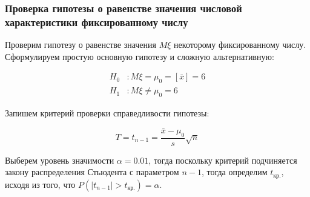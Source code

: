 \documentclass{report}
\begin{document}
\newpage

\subsubsection*{Проверка гипотезы о равенстве значения числовой характеристики фиксированному числу}

Проверим гипотезу о равенстве значения $M\xi$ некоторому фиксированному числу. Сформулируем простую основную гипотезу и сложную альтернативную:

\begin{equation*}
\begin{split}
H_0 & : M\xi = \mu_0 = [\bar x] = 6 \\
H_1 & : M\xi \ne \mu_0 = 6
\end{split}
\end{equation*}

Запишем критерий проверки справедливости гипотезы:

\begin{equation}
T = t_{n-1} = \frac{\bar x - \mu_0}{s}\sqrt{n}
\end{equation}

Выберем уровень значимости $\alpha = 0.01$, тогда поскольку критерий подчиняется закону распределения Стьюдента с параметром $n-1$, тогда определим $t_\text{кр.}$, исходя из того, что $P\left( |t_{n-1}| > t_\text{кр.} \right) = \alpha$.




\end{document}
